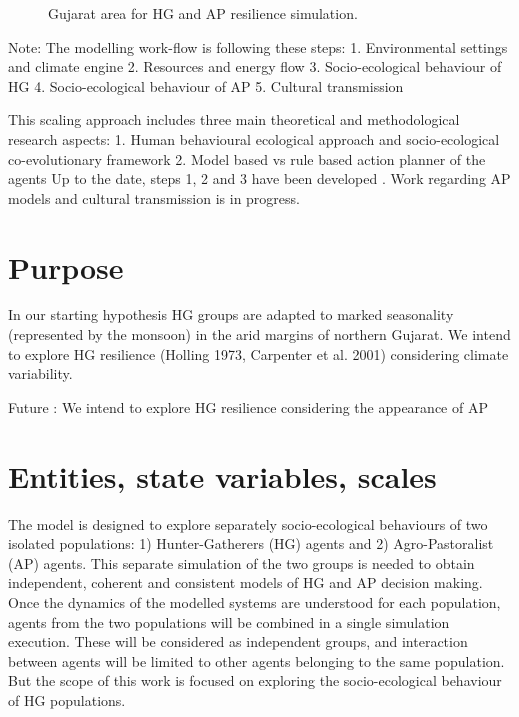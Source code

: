 \documentclass[11pt,oneside,a4paper,openright]{report}
\begin{document}
\begin{figure}[h!]
\centering
\setlength\fboxsep{0pt}
\setlength\fboxrule{0.5pt}
\caption{ Gujarat area for HG and AP resilience simulation.}
\label{fig:jamt_1}
\end{figure}


Note:
The modelling work-flow is following these steps:
1. Environmental settings and climate engine
2. Resources and energy flow
3. Socio-ecological behaviour of HG
4. Socio-ecological behaviour of AP
5. Cultural transmission

This scaling approach includes three main theoretical and methodological research aspects:
1. Human behavioural ecological approach and socio-ecological co-evolutionary framework
2. Model based vs rule based action planner of the agents
Up to the date, steps 1, 2 and 3 have been developed . Work regarding AP models and cultural
transmission is in progress.



\section{Purpose}
In our starting hypothesis HG groups are adapted to marked seasonality (represented by the
monsoon) in the arid margins of northern Gujarat. We intend to explore HG resilience (Holling 1973,
Carpenter et al. 2001) considering climate variability.

Future : We intend to explore HG resilience considering the appearance of AP

\section{Entities, state variables, scales}


The model is designed to explore separately socio-ecological behaviours of two isolated populations: 1)
Hunter-Gatherers (HG) agents and 2) Agro-Pastoralist (AP) agents. This separate simulation of the
two groups is needed to obtain independent, coherent and consistent models of HG and AP decision
making. Once the dynamics of the modelled systems are understood for each population, agents from
the two populations will be combined in a single simulation execution. These will be considered as
independent groups, and interaction between agents will be limited to other agents belonging to the
same population. But the scope of this work is focused on exploring the socio-ecological behaviour of HG populations.
\end{document}
